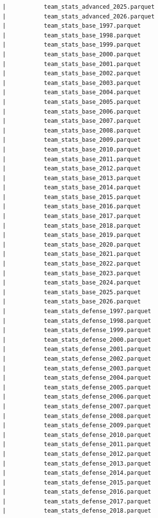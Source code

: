 \begin{lstlisting}
      |           team_stats_advanced_2025.parquet
      |           team_stats_advanced_2026.parquet
      |           team_stats_base_1997.parquet
      |           team_stats_base_1998.parquet
      |           team_stats_base_1999.parquet
      |           team_stats_base_2000.parquet
      |           team_stats_base_2001.parquet
      |           team_stats_base_2002.parquet
      |           team_stats_base_2003.parquet
      |           team_stats_base_2004.parquet
      |           team_stats_base_2005.parquet
      |           team_stats_base_2006.parquet
      |           team_stats_base_2007.parquet
      |           team_stats_base_2008.parquet
      |           team_stats_base_2009.parquet
      |           team_stats_base_2010.parquet
      |           team_stats_base_2011.parquet
      |           team_stats_base_2012.parquet
      |           team_stats_base_2013.parquet
      |           team_stats_base_2014.parquet
      |           team_stats_base_2015.parquet
      |           team_stats_base_2016.parquet
      |           team_stats_base_2017.parquet
      |           team_stats_base_2018.parquet
      |           team_stats_base_2019.parquet
      |           team_stats_base_2020.parquet
      |           team_stats_base_2021.parquet
      |           team_stats_base_2022.parquet
      |           team_stats_base_2023.parquet
      |           team_stats_base_2024.parquet
      |           team_stats_base_2025.parquet
      |           team_stats_base_2026.parquet
      |           team_stats_defense_1997.parquet
      |           team_stats_defense_1998.parquet
      |           team_stats_defense_1999.parquet
      |           team_stats_defense_2000.parquet
      |           team_stats_defense_2001.parquet
      |           team_stats_defense_2002.parquet
      |           team_stats_defense_2003.parquet
      |           team_stats_defense_2004.parquet
      |           team_stats_defense_2005.parquet
      |           team_stats_defense_2006.parquet
      |           team_stats_defense_2007.parquet
      |           team_stats_defense_2008.parquet
      |           team_stats_defense_2009.parquet
      |           team_stats_defense_2010.parquet
      |           team_stats_defense_2011.parquet
      |           team_stats_defense_2012.parquet
      |           team_stats_defense_2013.parquet
      |           team_stats_defense_2014.parquet
      |           team_stats_defense_2015.parquet
      |           team_stats_defense_2016.parquet
      |           team_stats_defense_2017.parquet
      |           team_stats_defense_2018.parquet

\end{lstlisting}

